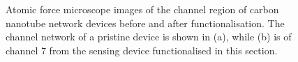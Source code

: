 \documentclass[
  a4paper,
]{scrbook}
\begin{document}
\begin{figure}
\begin{minipage}[t]{0.03\linewidth}
{\centering 


}

\end{minipage}%
%
\begin{minipage}[t]{0.01\linewidth}

{\centering 

~

}

\end{minipage}%
%
\begin{minipage}[t]{0.45\linewidth}

{\centering 


}

\end{minipage}%
%
\begin{minipage}[t]{0.01\linewidth}

{\centering 

~

}

\end{minipage}%

\caption{\label{fig-working-OR22a-AFM}Atomic force microscope images of
the channel region of carbon nanotube network devices before and after
functionalisation. The channel network of a pristine device is shown in
(a), while (b) is of channel 7 from the sensing device functionalised in
this section.}

\end{figure}
\end{document}
